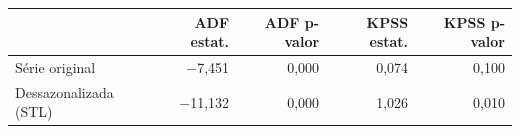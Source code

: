 \begin{tabular}{lrrrr}
\toprule
 & ADF estat. & ADF p-valor & KPSS estat. & KPSS p-valor \\
\midrule
Série original & $-$7,451 & 0,000 & 0,074 & 0,100 \\
Dessazonalizada (STL) & $-$11,132 & 0,000 & 1,026 & 0,010 \\
\bottomrule
\end{tabular}
